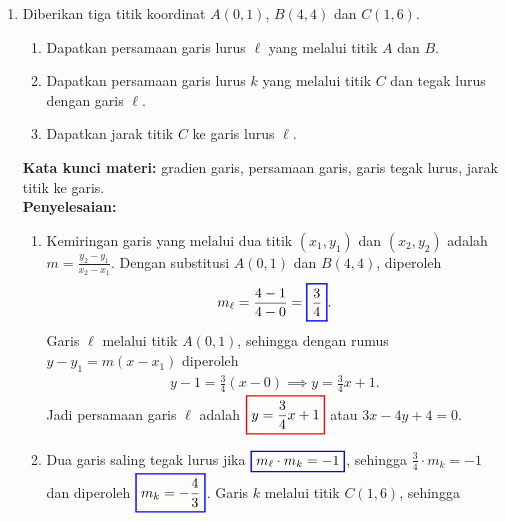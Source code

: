 \documentclass[10pt,openany,a4paper]{article}
\theoremstyle{definition}
\theoremstyle{definition}
\theoremstyle{plain}
\newenvironment{jawab}[2][tes]{%
\par\noindent\textbf{Kata kunci materi:} #1.\\
\textbf{Penyelesaian:} #2%
}{}
\begin{document}
\begin{enumerate}
    \item Diberikan tiga titik koordinat $A(0,1)$, $B(4,4)$ dan $C(1,6)$.
    \begin{enumerate}
        \item Dapatkan persamaan garis lurus $\ell$ yang melalui titik $A$ dan $B$.
        \item Dapatkan persamaan garis lurus $k$ yang melalui titik $C$ dan tegak lurus dengan garis $\ell$.
        \item Dapatkan jarak titik $C$ ke garis lurus $\ell$.
    \end{enumerate}
    \begin{jawab}[gradien garis, persamaan garis, garis tegak lurus, jarak titik ke garis]{
        \begin{enumerate}
            \item Kemiringan garis yang melalui dua titik $(x_1,y_1)$ dan $(x_2,y_2)$ adalah $m = \frac{y_2 - y_1}{x_2 - x_1}$. Dengan substitusi $A(0,1)$ dan $B(4,4)$, diperoleh
            \begin{align*}
                m_\ell = \frac{4-1}{4-0} = \colorlet{oldcolor}{.}
        \color{blue}
        \setlength{\fboxrule}{1pt} \boxed{\color{oldcolor}\frac{3}{4}}\color{oldcolor}.
            \end{align*}
            Garis $\ell$ melalui titik $A(0,1)$, sehingga dengan rumus $y - y_1 = m(x - x_1)$ diperoleh
            \begin{align*}
                y - 1 = \frac{3}{4}(x - 0) \implies y = \frac{3}{4}x + 1.
            \end{align*}
            Jadi persamaan garis $\ell$ adalah $\colorlet{oldcolor}{.}
        \color{red}
        \setlength{\fboxrule}{1pt} \boxed{\color{oldcolor}y = \frac{3}{4}x + 1}\color{oldcolor}$ atau $3x-4y+4=0$.
            \item Dua garis saling tegak lurus jika $\colorlet{oldcolor}{.}
        \color{blue}
        \setlength{\fboxrule}{1pt} \boxed{\color{oldcolor}m_\ell\cdot m_k=-1}\color{oldcolor}$, sehingga $\frac{3}{4}\cdot m_k=-1$ dan diperoleh $\colorlet{oldcolor}{.}
        \color{blue}
        \setlength{\fboxrule}{1pt} \boxed{\color{oldcolor}m_k=-\frac{4}{3}}\color{oldcolor}$. Garis $k$ melalui titik $C(1,6)$, sehingga
            \begin{align*}

\end{align*}
\end{enumerate}}
\end{jawab}
\end{enumerate}
\end{document}
